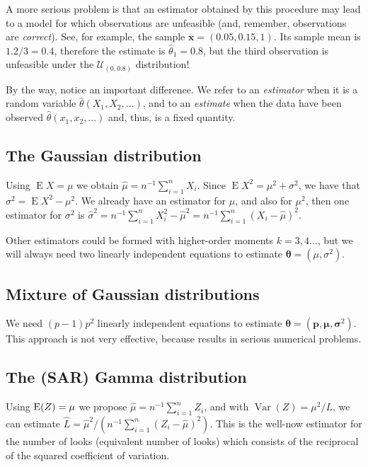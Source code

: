 A more serious problem is that an estimator obtained by this procedure may lead to a model for which observations are unfeasible (and, remember, observations are \emph{correct}).
See, for example, the sample $\bm x=(0.05, 0.15, 1)$.
Its sample mean is $1.2/3=0.4$, therefore the estimate is $\widehat{\theta}_1=0.8$, but the third observation is unfeasible under the $\mathcal U_{(0,0.8)}$ distribution!

By the way, notice an important difference.
We refer to an \emph{estimator} when it is a random variable $\widehat{\theta}(X_1, X_2, \dots)$, and to an \emph{estimate} when the data have been observed $\widehat{\theta}(x_1, x_2, \dots)$ and, thus, is a fixed quantity.

\subsection{The Gaussian distribution}

Using $\operatorname{E}X=\mu$ we obtain $\widehat{\mu}=n^{-1}\sum_{i=1}^{n} X_i$.
Since $\operatorname{E}X^2=\mu^2+\sigma^2$, we have that $\sigma^2=\operatorname{E}X^2-\mu^2$.
We already have an estimator for $\mu$, and also for $\mu^2$, then one estimator for $\sigma^2$ is $\widehat{\sigma}^2=n^{-1}\sum_{i=1}^{n}X_i^2-\widehat{\mu}^2 = n^{-1}\sum_{i=1}^{n}(X_i-\widehat{\mu})^2$.

Other estimators could be formed with higher-order moments $k=3,4\dots$, but we will always need two linearly independent equations to estimate $\bm\theta=(\mu,\sigma^2)$.

\subsection{Mixture of Gaussian distributions}\label{Sec:MixtureGaussian}

We need $(p-1)p^2$ linearly independent equations to estimate $\bm{\theta} = (\bm p, \bm \mu, \bm \sigma^2)$.
This approach is not very effective, because results in serious numerical problems.

\subsection{The (SAR) Gamma distribution}

Using $\operatorname{E}(Z)=\mu$ we propose $\widehat{\mu}=n^{-1}\sum_{i=1}^n Z_i$,
and with 
$\operatorname{Var}(Z)=\mu^2/L$, we can estimate $\widehat L=\widehat{\mu}^2 / (n^{-1}\sum_{i=1}^n (Z_i - \widehat{\mu})^2)$.
This is the well-now estimator for the number of looks (equivalent number of looks) which consists of the reciprocal of the squared coefficient of variation.

